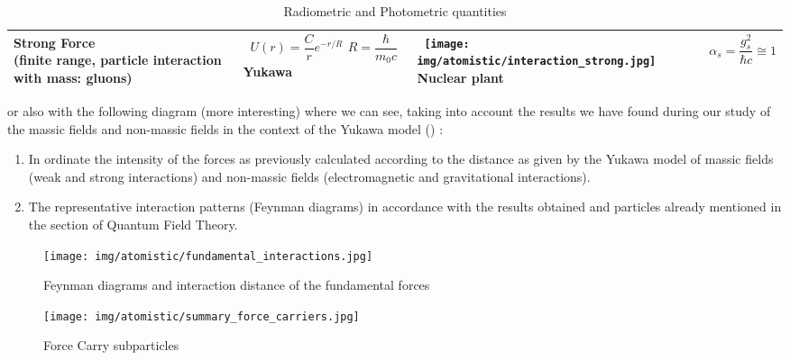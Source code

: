 \begin{table}[H]
\begin{center}
{\begin{tabular}{|m{5.5cm}|m{3.5cm}|m{3cm}|m{3cm}|}
		 \hline 
		 \pbox{5cm}{Strong Force \\ \tiny (finite range, particle interaction with mass: gluons)} & \centering\arraybackslash\ \pbox{5cm}{$U(r)=\dfrac{C}{r}e^{-r/R}$ \\ $R=\dfrac{\hbar}{m_0c}$ \\ \tiny Yukawa} & \centering\arraybackslash\  \pbox{5cm}{\texttt{[image: img/atomistic/interaction\_strong.jpg]} \\ \tiny Nuclear plant} & \centering\arraybackslash\ $\alpha_s=\dfrac{g_s^2}{\hbar c}\cong 1$ \\ 
		 \hline 
		 \end{tabular}}
		\caption[]{Radiometric and Photometric quantities}
		\end{center}
	\end{table}
	 or also with the following diagram (more interesting) where we can see, taking into account the results we have found during our study of the massic fields and non-massic fields in the context of the Yukawa model () : 
	\begin{enumerate}
		\item In ordinate the intensity of the forces as previously calculated according to the distance as given by the Yukawa model of massic fields (weak and strong interactions) and non-massic fields (electromagnetic and gravitational interactions).

		\item The representative interaction patterns (Feynman diagrams) in accordance with the results obtained and particles already mentioned in the section of Quantum Field Theory.
	\end{enumerate}
	\begin{figure}[H]
		\begin{center}
		\texttt{[image: img/atomistic/fundamental\_interactions.jpg]}
		\end{center}	
		\caption{Feynman diagrams and interaction distance of the fundamental forces}
	\end{figure}
	 
	 \begin{figure}[H]
		\begin{center}
		\texttt{[image: img/atomistic/summary\_force\_carriers.jpg]}
		\end{center}	
		\caption{Force Carry subparticles}
	\end{figure}
	
